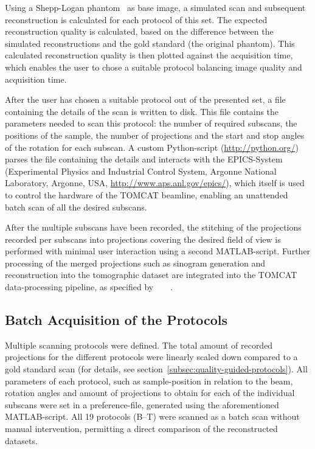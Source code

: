 Using a Shepp-Logan phantom~\cite{Shepp1974} as base image, a simulated scan and subsequent reconstruction is calculated for each protocol of this set. The expected reconstruction quality is calculated, based on the difference between the simulated reconstructions and the gold standard (the original phantom). This calculated reconstruction quality is then plotted against the acquisition time, which enables the user to chose a suitable protocol balancing image quality and acquisition time.

After the user has chosen a suitable protocol out of the presented set, a file containing the details of the scan is written to disk. This file contains the parameters needed to scan this protocol: the number of required subscans, the positions of the sample, the number of projections and the start and stop angles of the rotation for each subscan. A custom Python-script (\url{http://python.org/}) parses the file containing the details and interacts with the EPICS-System (Experimental Physics and Industrial Control System, Argonne National Laboratory, Argonne, USA, \url{http://www.aps.anl.gov/epics/}), which itself is used to control the hardware of the TOMCAT beamline, enabling an unattended batch scan of all the desired subscans.

After the multiple subscans have been recorded, the stitching of the projections recorded per subscans into projections covering the desired field of view is performed with minimal user interaction using a second MATLAB-script. Further processing of the merged projections such as sinogram generation and reconstruction into the tomographic dataset are integrated into the TOMCAT data-processing pipeline, as specified by%
\ifhtml%
	~\citet{Hintermueller2009}%
\else%
	~%
\fi%
.

\subsection{Batch Acquisition of the Protocols}%
Multiple scanning protocols were defined. The total amount of recorded projections for the different protocols were linearly scaled down compared to a gold standard scan (for details, see section~\ref{subsec:quality-guided-protocols}). All parameters of each protocol, such as sample-position in relation to the beam, rotation angles and amount of projections to obtain for each of the individual subscans were set in a preference-file, generated using the aforementioned MATLAB-script. All 19 protocols (B--T) were scanned as a batch scan without manual intervention, permitting a direct comparison of the reconstructed datasets.

